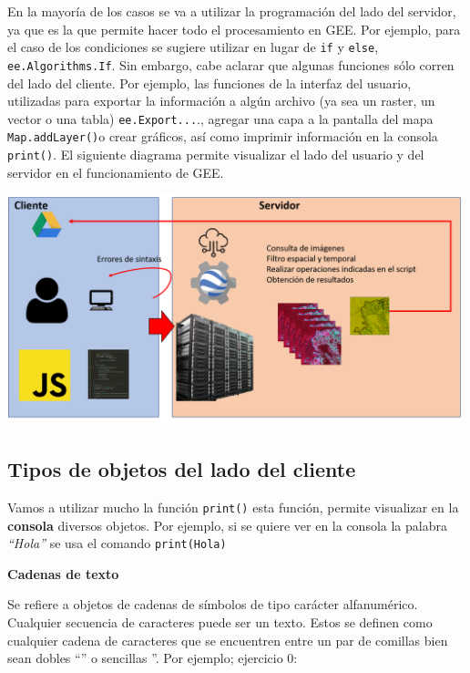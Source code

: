 \documentclass[
]{article}
\begin{document}
En la mayoría de los casos se va a utilizar la programación del lado del
servidor, ya que es la que permite hacer todo el procesamiento en GEE.
Por ejemplo, para el caso de los condiciones se sugiere utilizar en
lugar de \texttt{if} y \texttt{else}, \texttt{ee.Algorithms.If}. Sin
embargo, cabe aclarar que algunas funciones sólo corren del lado del
cliente. Por ejemplo, las funciones de la interfaz del usuario,
utilizadas para exportar la información a algún archivo (ya sea un
raster, un vector o una tabla) \texttt{ee.Export...}., agregar una capa
a la pantalla del mapa \texttt{Map.addLayer()}o crear gráficos, así como
imprimir información en la consola \texttt{print()}. El siguiente
diagrama permite visualizar el lado del usuario y del servidor en el
funcionamiento de GEE.

\includegraphics[width=500px]{Img/daigFunc}

\hypertarget{tipos-de-objetos-del-lado-del-cliente}{%
\subsection{Tipos de objetos del lado del
cliente}\label{tipos-de-objetos-del-lado-del-cliente}}

\begin{tipblock}
Vamos a utilizar mucho la función \texttt{print()} esta función, permite
visualizar en la \textbf{consola} diversos objetos. Por ejemplo, si se
quiere ver en la consola la palabra \emph{``Hola''} se usa el comando
\texttt{print(\textquotesingle{}Hola\textquotesingle{})}

\end{tipblock}

\textbf{Cadenas de texto}

Se refiere a objetos de cadenas de símbolos de tipo carácter
alfanumérico. Cualquier secuencia de caracteres puede ser un texto.
Estos se definen como cualquier cadena de caracteres que se encuentren
entre un par de comillas bien sean dobles ``'' o sencillas ''. Por
ejemplo; ejercicio 0:
\end{document}
